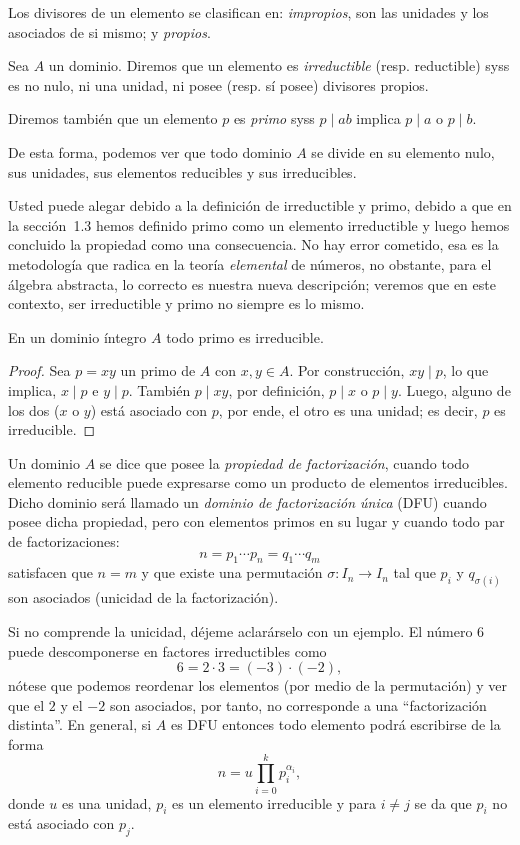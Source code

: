 \documentclass[11pt,oneside]{book}
\begin{document}
Los divisores de un elemento se clasifican en: \textit{impropios}, son las unidades y los asociados de si mismo; y \textit{propios}.
\begin{mydef}
Sea $A$ un dominio. Diremos que un elemento es \textit{irreductible} (resp. reductible) syss es no nulo, ni una unidad, ni posee (resp. sí posee) divisores propios.

Diremos también que un elemento $p$ es \textit{primo} syss $p\mid ab$ implica $p\mid a$ o $p\mid b$.
\end{mydef}
De esta forma, podemos ver que todo dominio $A$ se divide en su elemento nulo, sus unidades, sus elementos reducibles y sus irreducibles.

Usted puede alegar debido a la definición de irreductible y primo, debido a que en la sección~1.3 hemos definido primo como un elemento irreductible y luego hemos concluido la propiedad como una consecuencia. No hay error cometido, esa es la metodología que radica en la teoría \textit{elemental} de números, no obstante, para el álgebra abstracta, lo correcto es nuestra nueva descripción; veremos que en este contexto, ser irreductible y primo no siempre es lo mismo.
\begin{thm}
En un dominio íntegro $A$ todo primo es irreducible.
\end{thm}
\begin{proof}
Sea $p=xy$ un primo de $A$ con $x,y\in A$. Por construcción, $xy\mid p$, lo que implica, $x\mid p$ e $y\mid p$. También $p\mid xy$, por definición, $p\mid x$ o $p\mid y$. Luego, alguno de los dos ($x$ o $y$) está asociado con $p$, por ende, el otro es una unidad; es decir, $p$ es irreducible.
\end{proof}
\begin{mydef}
Un dominio $A$ se dice que posee la \textit{propiedad de factorización}, cuando todo elemento reducible puede expresarse como un producto de elementos irreducibles. Dicho dominio será llamado un \textit{dominio de factorización única} (DFU) cuando posee dicha propiedad, pero con elementos primos en su lugar y cuando todo par de factorizaciones:
$$n=p_1\cdots p_n=q_1\cdots q_m$$
satisfacen que $n=m$ y que existe una permutación $\sigma:I_n\rightarrow I_n$ tal que $p_i$ y $q_{\sigma(i)}$ son asociados (unicidad de la factorización).
\end{mydef}
Si no comprende la unicidad, déjeme aclarárselo con un ejemplo. El número 6 puede descomponerse en factores irreductibles como
$$6=2\cdot 3=(-3)\cdot(-2),$$
nótese que podemos reordenar los elementos (por medio de la permutación) y ver que el $2$ y el $-2$ son asociados, por tanto, no corresponde a una ``factorización distinta''. En general, si $A$ es DFU entonces todo elemento podrá escribirse de la forma
$$n=u\prod_{i=0}^k p_i^{\alpha_i},$$
donde $u$ es una unidad, $p_i$ es un elemento irreducible y para $i\neq j$ se da que $p_i$ no está asociado con $p_j$.
\end{document}
